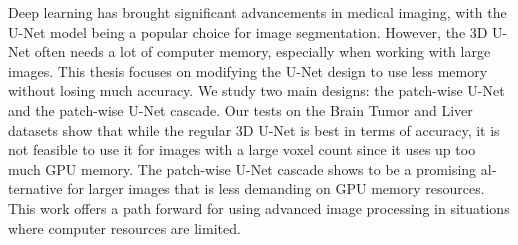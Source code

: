 \null\vfil
\begin{otherlanguage}{english}
\begin{center}\textsf{\textbf{\abstractname}}\end{center}

\noindent Deep learning has brought significant advancements in medical imaging,
with the U-Net model being a popular choice for image segmentation. However,
the $3$D U-Net often needs a lot of computer memory, especially when working with large images.
This thesis focuses on modifying the U-Net design to use less memory without losing much accuracy.
We study two main designs: the patch-wise U-Net and the patch-wise U-Net cascade.
Our tests on the Brain Tumor and Liver datasets show that while the regular $3$D U-Net is best in terms of accuracy,
it is not feasible to use it for images with a large voxel count since it uses up too much GPU memory.
The patch-wise U-Net cascade shows to be a promising alternative for larger images that is less demanding on GPU memory resources.
This work offers a path forward for using advanced image processing in situations where computer resources are limited.
\end{otherlanguage}
\vfil\null
